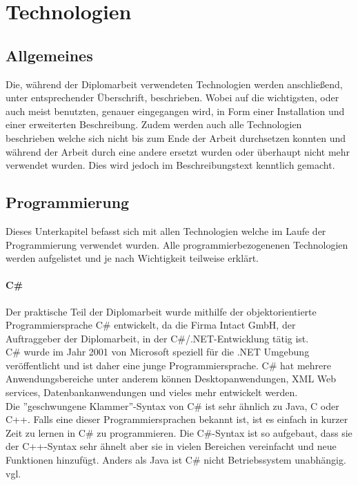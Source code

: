 \renewcommand{\theauthor}{Dario Wagner}
\chapter{Technologien}
\label{sec:Technologien}
\section{Allgemeines}
\label{sec:TechnologieAllgemeines}
Die, während der Diplomarbeit verwendeten Technologien werden anschließend, unter entsprechender Überschrift, beschrieben. Wobei auf die wichtigsten, oder auch meist benutzten, genauer eingegangen wird, in Form einer Installation und einer erweiterten Beschreibung. Zudem werden auch alle Technologien beschrieben welche sich nicht bis zum Ende der Arbeit durchsetzen konnten und während der Arbeit durch eine andere ersetzt wurden oder überhaupt nicht mehr verwendet wurden. Dies wird jedoch im Beschreibungstext kenntlich gemacht.
\section{Programmierung}
\label{sec:TechnologieProgrammierung}
Dieses Unterkapitel befasst sich mit allen Technologien welche im Laufe der Programmierung verwendet wurden. Alle programmierbezogenenen Technologien werden aufgelistet und je nach Wichtigkeit teilweise erklärt.
\subsubsection{C\#}
\label{sec:CSharp}
Der praktische Teil der Diplomarbeit wurde mithilfe der objektorientierte Programmiersprache C\# entwickelt, da die Firma Intact GmbH, der Auftraggeber der Diplomarbeit, in der C\#/.NET-Entwicklung tätig ist. \\ \break
C\# wurde im Jahr 2001 von Microsoft speziell für die .NET Umgebung veröffentlicht und ist daher eine junge Programmiersprache. C\# hat mehrere Anwendungsbereiche unter anderem können Desktopanwendungen, XML Web services, Datenbankanwendungen und vieles mehr entwickelt werden. \\ \break
Die ''geschwungene Klammer''-Syntax von C\# ist sehr ähnlich zu Java, C oder C++. Falls eine dieser Programmiersprachen bekannt ist, ist es einfach in kurzer Zeit zu lernen in C\# zu programmieren. Die C\#-Syntax ist so aufgebaut, dass sie der C++-Syntax sehr ähnelt aber sie in vielen Bereichen vereinfacht und neue Funktionen hinzufügt. Anders als Java ist C\# nicht Betriebssystem unabhängig. \\vgl. \textcite{TechnologieCSharpErklaerung} 
